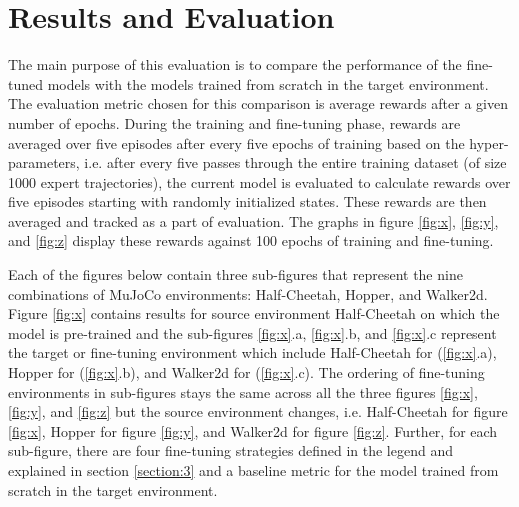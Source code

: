 \documentclass[10pt,a4paper]{article}
\begin{document}
\section{Results and Evaluation}
The main purpose of this evaluation is to compare the performance of the fine-tuned models with the models trained from scratch 
in the target environment. The evaluation metric chosen for this comparison is average rewards after a given number of epochs.
During the training and fine-tuning phase, rewards are averaged over five episodes after every five epochs of training based on the
hyper-parameters, i.e. after every five passes through the entire training dataset (of size 1000 expert trajectories), the current 
model is evaluated to calculate rewards over five episodes starting with randomly initialized states. These rewards are then averaged 
and tracked as a part of evaluation. The graphs in figure \ref{fig:x}, \ref{fig:y}, and \ref{fig:z} display these rewards against 100 
epochs of training and fine-tuning.

Each of the figures below contain three sub-figures that represent the nine combinations of MuJoCo environments: Half-Cheetah, 
Hopper, and Walker2d. Figure \ref{fig:x} contains results for source environment Half-Cheetah on which the model is pre-trained 
and the sub-figures \ref{fig:x}.a, \ref{fig:x}.b, and \ref{fig:x}.c represent the target or fine-tuning environment which include 
Half-Cheetah for (\ref{fig:x}.a), Hopper for (\ref{fig:x}.b), and Walker2d for (\ref{fig:x}.c). The ordering of fine-tuning 
environments in sub-figures stays the same across all the three figures \ref{fig:x}, \ref{fig:y}, and \ref{fig:z} but the source 
environment changes, i.e. Half-Cheetah for figure \ref{fig:x}, Hopper for figure \ref{fig:y}, and Walker2d for figure \ref{fig:z}.
Further, for each sub-figure, there are four fine-tuning strategies defined in the legend and explained in section \ref{section:3} 
and a baseline metric for the model trained from scratch in the target environment.
\end{document}
